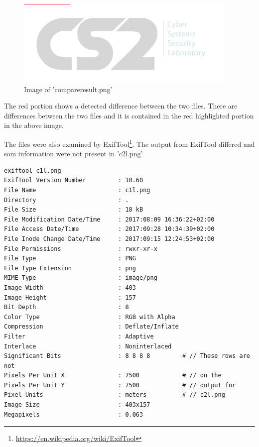 \documentclass[a4paper,10pt,oneside]{article}
\begin{document}
\begin{figure}[ht]
	\includegraphics[width=\textwidth]{images/compareresult.png}
	\caption{Image of 'compareresult.png'}
	\centering
\end{figure}

The red portion shows a detected difference between the two files. There are differences between the two files and it is contained in the red highlighted portion in the above image.

The files were also examined by ExifTool\footnote{\url{https://en.wikipedia.org/wiki/ExifTool}}. The output from
ExifTool differed and som information were not present in 'c2l.png'

\begin{lstlisting}[caption=ExifTool output for 'c1l.png']
exiftool c1l.png
ExifTool Version Number         : 10.60
File Name                       : c1l.png
Directory                       : .
File Size                       : 18 kB
File Modification Date/Time     : 2017:08:09 16:36:22+02:00
File Access Date/Time           : 2017:09:28 10:34:39+02:00
File Inode Change Date/Time     : 2017:09:15 12:24:53+02:00
File Permissions                : rwxr-xr-x
File Type                       : PNG
File Type Extension             : png
MIME Type                       : image/png
Image Width                     : 403
Image Height                    : 157
Bit Depth                       : 8
Color Type                      : RGB with Alpha
Compression                     : Deflate/Inflate
Filter                          : Adaptive
Interlace                       : Noninterlaced
Significant Bits                : 8 8 8 8         # // These rows are not
Pixels Per Unit X               : 7500            # // on the
Pixels Per Unit Y               : 7500            # // output for
Pixel Units                     : meters          # // c2l.png
Image Size                      : 403x157
Megapixels                      : 0.063
\end{lstlisting}
\end{document}
